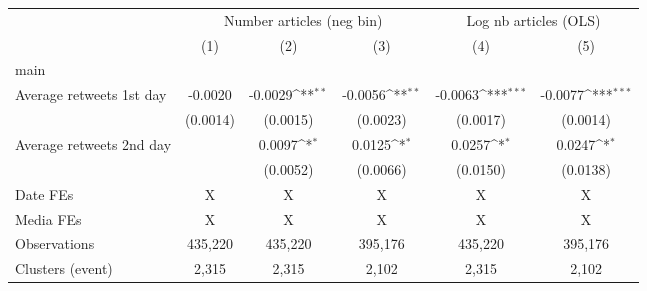 {
\def\sym#1{\ifmmode^{#1}\else\(^{#1}\)\fi}
\begin{tabular}{l*{5}{c}}
\hline\hline
                    &\multicolumn{3}{c}{Number articles (neg bin)}                    &\multicolumn{2}{c}{Log nb articles (OLS)}  \\\cmidrule(lr){2-4}\cmidrule(lr){5-6}
                    &\multicolumn{1}{c}{(1)}         &\multicolumn{1}{c}{(2)}         &\multicolumn{1}{c}{(3)}         &\multicolumn{1}{c}{(4)}         &\multicolumn{1}{c}{(5)}         \\
\hline
main                &                     &                     &                     &                     &                     \\
Average retweets 1st day&     -0.0020         &     -0.0029\sym{**} &     -0.0056\sym{**} &     -0.0063\sym{***}&     -0.0077\sym{***}\\
                    &    (0.0014)         &    (0.0015)         &    (0.0023)         &    (0.0017)         &    (0.0014)         \\
Average retweets 2nd day&                     &      0.0097\sym{*}  &      0.0125\sym{*}  &      0.0257\sym{*}  &      0.0247\sym{*}  \\
                    &                     &    (0.0052)         &    (0.0066)         &    (0.0150)         &    (0.0138)         \\
\hline
Date FEs            &           X         &           X         &           X         &           X         &           X         \\
Media FEs           &           X         &           X         &           X         &           X         &           X         \\
Observations        &     435,220         &     435,220         &     395,176         &     435,220         &     395,176         \\
Clusters (event)    &       2,315         &       2,315         &       2,102         &       2,315         &       2,102         \\
\hline\hline
\end{tabular}
}
